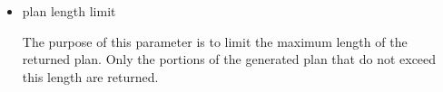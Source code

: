 \begin{itemize}
    \item plan length limit
    
    The purpose of this parameter is to limit the maximum length of the returned plan. Only the portions of the generated plan that do not exceed this length are returned.
    

    
\end{itemize}


